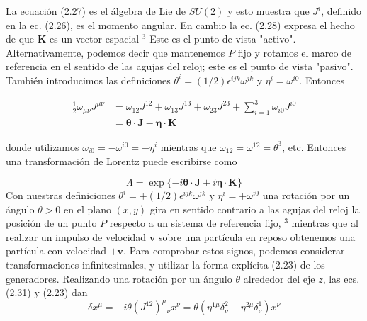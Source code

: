           La ecuación (2.27) es el álgebra de Lie de $S U(2)$ y esto muestra que $J^{i}$, definido en la ec. (2.26), es el momento angular. En cambio la ec. (2.28) expresa el hecho de que $\mathbf{K}$ es un vector espacial ${ }^{3}$ Este es el punto de vista "activo". Alternativamente, podemos decir que mantenemos $P$ fijo y rotamos el marco de referencia en el sentido de las agujas del reloj; este es el punto de vista "pasivo". También introducimos las definiciones $\theta^{i}=(1 / 2) \epsilon^{i j k} \omega^{j k}$ y $\eta^{i}=\omega^{i 0}$. Entonces

          \begin{align*}
            \frac{1}{2} \omega_{\mu \nu} J^{\mu \nu} & =\omega_{12} J^{12}+\omega_{13} J^{13}+\omega_{23} J^{23}+\sum_{i=1}^{3} \omega_{i 0} J^{i 0} \\
            & =\boldsymbol{\theta} \cdot \mathbf{J}-\boldsymbol{\eta} \cdot \mathbf{K} \tag{2.30}
            \end{align*}

            donde utilizamos $\omega_{i 0}=-\omega^{i 0}=-\eta^{i}$ mientras que $\omega_{12}=\omega^{12}=\theta^{3}$, etc. Entonces una transformación de Lorentz puede escribirse como

            \begin{equation*}
              \Lambda=\exp \{-i \boldsymbol{\theta} \cdot \mathbf{J}+i \boldsymbol{\eta} \cdot \mathbf{K}\} \tag{2.31}
              \end{equation*}
              Con nuestras definiciones $\theta^{i}=+(1 / 2) \epsilon^{i j k} \omega^{j k}$ y $\eta^{i}=+\omega^{i 0}$ una rotación por un ángulo $\theta>0$ en el plano $(x, y)$ gira en sentido contrario a las agujas del reloj la posición de un punto $P$ respecto a un sistema de referencia fijo, ${ }^{3}$ mientras que al realizar un impulso de velocidad $\mathbf{v}$ sobre una partícula en reposo obtenemos una partícula con velocidad $+\mathbf{v}$. Para comprobar estos signos, podemos considerar transformaciones infinitesimales, y utilizar la forma explícita (2.23) de los generadores. Realizando una rotación por un ángulo $\theta$ alrededor del eje $z$, las ecs. (2.31) y (2.23) dan
              \begin{equation*}
                \delta x^{\mu}=-i \theta\left(J^{12}\right)^{\mu}{ }_{\nu} x^{\nu}=\theta\left(\eta^{1 \mu} \delta_{\nu}^{2}-\eta^{2 \mu} \delta_{\nu}^{1}\right) x^{\nu} \tag{2.32}
              \end{equation*}
              
